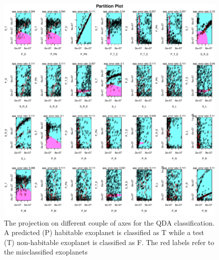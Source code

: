 \documentclass[
12pt, %
a4paper, %
oneside, %
headinclude,footinclude, %
BCOR5mm, %
]{scrartcl}
\begin{document}
\begin{figure}[h]
\begin{center}
\includegraphics[width=1\textwidth]{Pic/QDA_project_FULL.pdf}
\caption{The projection on different couple of axes for the QDA classification. A predicted (P) habitable exoplanet is classified as T while a test (T) non-habitable exoplanet is classified as F. The red labels refer to the misclassified exoplanets}
\label{QDA_project_FULL}
\end{center}
\end{figure}
\end{document}

